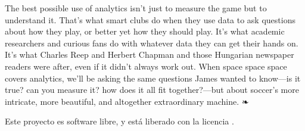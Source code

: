 The best possible use of analytics isn’t just to measure the game but to understand it. That’s what smart clubs do when they use data to ask questions about how they play, or better yet how they should play. It’s what academic researchers and curious fans do with whatever data they can get their hands on. It’s what Charles Reep and Herbert Chapman and those Hungarian newspaper readers were after, even if it didn’t always work out. When space space space covers analytics, we’ll be asking the same questions James wanted to know—is it true? can you measure it? how does it all fit together?—but about soccer’s more intricate, more beautiful, and altogether extraordinary machine. ❧



Este proyecto es software libre, y está liberado con la licencia \cite{gplv3}.
